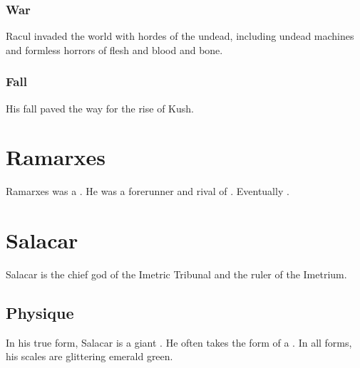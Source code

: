 \subsubsection{War}
Racul invaded the world with hordes of the undead, including undead machines and formless horrors of flesh and blood and bone. 





\subsubsection{Fall}
His fall paved the way for the rise of Kush.















\section{Ramarxes}
Ramarxes was a \caisith.
He was a forerunner and rival of . 
Eventually . 















\section{Salacar}
Salacar is the chief god of the Imetric Tribunal and the ruler of the Imetrium. 









\subsection{Physique}
In his true form, Salacar is a giant \nagalord. 
He often takes the form of a \scatha. 
In all forms, his scales are glittering emerald green. 















